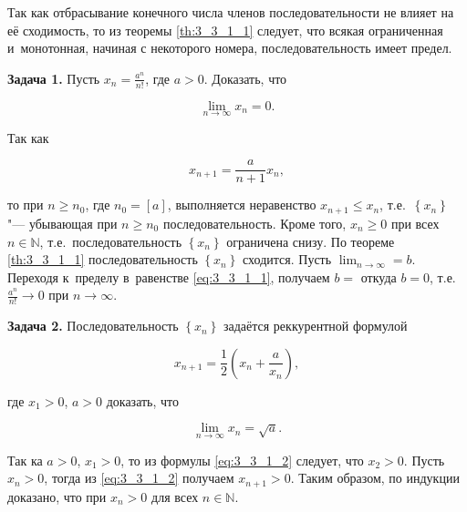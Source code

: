 \begin{Note}\label{nt:3_3_1_1}
Так как отбрасывание конечного числа членов последовательности не влияет
на её сходимость, то из теоремы \ref{th:3_3_1_1} следует, что всякая ограниченная
и~монотонная, начиная с некоторого номера, последовательность имеет предел.
\end{Note}

\textbf{Задача 1.}\label{ex:3_3_1_1} Пусть $\displaystyle x_{n} = \frac{a^{n}}{n!}$,
где $a > 0$. Доказать, что

\begin{equation*}
\displaystyle \lim_{n \to \infty} x_{n} = 0.
\end{equation*}

Так как 

\begin{equation}\label{eq:3_3_1_1}
\displaystyle x_{n+1} = \frac{a}{n+1} x_{n},
\end{equation}

\noindent
то при $n \geqslant n_{0}$, где $n_{0} = [a]$, выполняется неравенство
$x_{n+1} \leqslant x_{n}$,
т.е.\ $\left\{ x_{n} \right\}$ "--- убывающая при $n \geqslant n_{0}$
последовательность.
Кроме того, $x_{n} \geqslant 0$ при всех $n \in \mathbb{N}$,
т.е.\ последовательность $\left\{ x_{n} \right\}$ ограничена снизу.
По теореме \ref{th:3_3_1_1} последовательность $\left\{ x_{n} \right\}$ сходится.
Пусть $\displaystyle \lim_{n \to \infty} = b$.
Переходя к~пределу в~равенстве \eqref{eq:3_3_1_1}, получаем $b = $ 
откуда $b = 0$,
т.е.\ $\displaystyle \frac{a^{n}}{n!} \rightarrow 0$ при $n \rightarrow \infty$.

\textbf{Задача 2.}\label{ex:3_3_1_2} Последовательность $\left\{ x_{n} \right\}$
задаётся реккурентной формулой

\begin{equation}\label{eq:3_3_1_2}
\displaystyle x_{n+1} = \frac{1}{2} \left( x_{n} + \frac{a}{x_{n}} \right),
\end{equation}

\noindent
где $x_{1} > 0$, $a > 0$ доказать, что

\begin{equation*}
\displaystyle \lim_{n \to \infty} x_{n} = \sqrt{a}.
\end{equation*}

Так ка $a > 0$, $x_{1} > 0$, то из формулы \eqref{eq:3_3_1_2} следует, что $x_{2} > 0$.
Пусть $x_{n} > 0$, тогда из \eqref{eq:3_3_1_2} получаем $x_{n+1} > 0$.
Таким образом, по индукции доказано, что при $x_{n} > 0$ для всех $n \in \mathbb{N}$.

